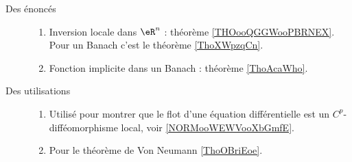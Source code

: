        \begin{description}
           \item[Des énoncés] 
               \begin{enumerate}
    \item Inversion locale dans \( \eR^n\) : théorème \ref{THOooQGGWooPBRNEX}. Pour un Banach c'est le théorème \ref{ThoXWpzqCn}.
    \item
        Fonction implicite dans un Banach : théorème \ref{ThoAcaWho}.
               \end{enumerate}
           \item[Des utilisations]   
               \begin{enumerate}
                       
    \item
        Utilisé pour montrer que le flot d'une équation différentielle est un \( C^p\)-difféomorphisme local, voir \ref{NORMooWEWVooXbGmfE}. %
    \item 
        Pour le théorème de Von Neumann \ref{ThoOBriEoe}.
               \end{enumerate}
       \end{description}
